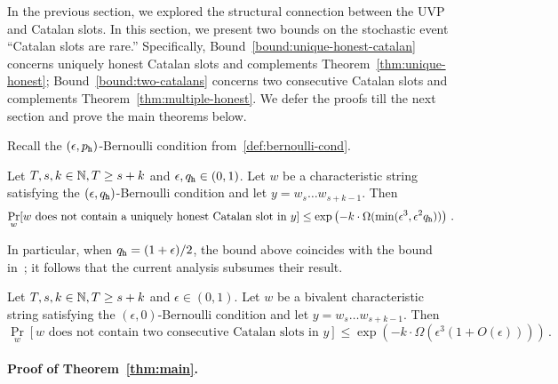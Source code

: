 
In the previous section, 
we explored the structural connection 
between the UVP and Catalan slots. 
In this section, we present two bounds 
on the stochastic event ``Catalan slots are rare.'' 
Specifically,
Bound~\ref{bound:unique-honest-catalan} 
concerns uniquely honest Catalan slots and complements Theorem~\ref{thm:unique-honest}; 
Bound~\ref{bound:two-catalans} concerns 
two consecutive Catalan slots and complements Theorem~\ref{thm:multiple-honest}. 
We defer the proofs till the next section 
and prove the main theorems below.



Recall the $(\epsilon, p_{\mathtt{h}})$-Bernoulli condition 
from~\ref{def:bernoulli-cond}.
\begin{bound}\label{bound:unique-honest-catalan}
  Let $T, s, k \in \mathbb{N}, T \geq s + k$ and  $\epsilon, q_{\mathtt{h}} \in (0, 1)$. 
  Let $w$ be a characteristic string satisfying 
  the $(\epsilon, q_{\mathtt{h}})$-Bernoulli condition 
  and let $y = w_s \ldots w_{s+k-1}$.
  Then 
  \[
    \Pr_w[\text{$w$ does not contain a uniquely honest Catalan slot in $y$}]  
      \leq 
      \exp\left(
        -k\cdot \Omega(\min(\epsilon^3, \epsilon^2 q_{\mathtt{h}})) 
      \right)
      \,.
  \]
\end{bound}
In particular, 
when $q_{\mathtt{h}} = (1+\epsilon)/2$, 
the bound above coincides with the 
bound in~\cite{LinearConsistency}; 
it follows that the current analysis 
subsumes their result.




\begin{bound}\label{bound:two-catalans}
  Let $T, s, k \in \mathbb{N}, T \geq s + k$ and  $\epsilon \in (0, 1)$. 
  Let $w$ be a bivalent characteristic string satisfying 
  the $(\epsilon, 0)$-Bernoulli condition 
  and let $y = w_s \ldots w_{s+k-1}$.
  Then 
  \[
    \Pr_w[\text{$w$ does not contain two consecutive Catalan slots in $y$}]  
      \leq 
      \exp\left(
        - k\cdot \Omega(\epsilon^3(1 + O(\epsilon))) 
      \right)
      \,.
  \]
\end{bound}





\paragraph{Proof of Theorem~\ref{thm:main}.}

